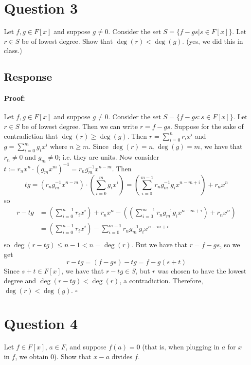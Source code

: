 \documentclass [12pt] {article}
\newenvironment{proof}{\paragraph{Proof:}}{\hfill$\square$}
\begin{document}
\section*{Question 3}
Let $f,g\in F[x]$ and suppose $g\neq 0$. Consider the set $S=\{f-gs|s\in F[x]\}$. Let $r\in S$ be of
lowest degree. Show that $\deg(r)<\deg(g)$. (yes, we did this in class.)

\subsection*{Response}
\begin{proof}
    Let $f, g \in F[x]$ and suppose $g \neq 0$. Consider the set $S = \{ f - gs : s \in F[x] \}$.
    Let $r \in S$ be of lowest degree. Then we can write $r = f - gs$. Suppose
    for the sake of contradiction that $\deg(r) \geq \deg(g)$. Then
    $r = \sum\limits_{i = 0}^{n} r_i x^i$ and $g = \sum\limits_{i = 0}^{m} g_i x^i$ where
    $n \geq m$. Since $\deg(r) = n, \deg(g) = m$, we have that  $r_n \neq 0$ and $g_m \neq 0$;
    i.e. they are units. Now consider
    $t := r_n x^n \cdot (g_m x^m)^{-1} = r_n g_m^{-1} x^{n - m}$. Then
    \[
        tg = \left(r_n g_m^{-1} x^{n - m}\right) \cdot \left(\sum\limits_{i = 0}^{m} g_i x^i\right)
        =
        \left(\sum\limits_{i = 0}^{m - 1} r_n g_m^{-1} g_i x^{n - m + i}\right) +
        r_n x^n
    \]
    so
    \begin{align*}
        r - tg &= \left(\sum\limits_{i = 0}^{n - 1} r_i x^i\right) + r_n x^n -
        \left(\left(\sum\limits_{i = 0}^{m - 1} r_n g_m^{-1} g_i x^{n - m + i}\right) +
        r_n x^n\right) \\
               &= \left(\sum\limits_{i = 0}^{n - 1} r_i x^i\right) -
               \sum\limits_{i = 0}^{m - 1} r_n g_m^{-1} g_i x^{n - m + i} \\
    \end{align*}
    so $\deg(r - tg) \leq n - 1 < n = \deg(r)$. But we have that
    $r = f - gs$, so we get
    \[
        r - tg = (f - gs) - tg = f - g(s + t)
    \]
    Since $s + t \in F[x]$, we have that $r - tg \in S$, but $r$ was chosen to have the lowest
    degree and $\deg(r - tg) < \deg(r)$, a contradiction. Therefore, $\deg(r) < \deg(g)$.
\end{proof}
\newpage

\section*{Question 4}
Let $f\in F[x]$, $a\in F$, and suppose $f(a)=0$ (that is, when plugging in $a$ for $x$ in $f$, we
obtain $0$). Show that $x-a$ divides $f$.
\end{document}
